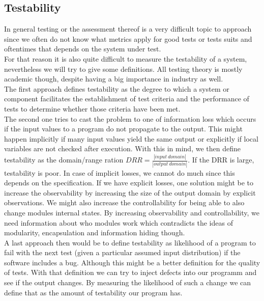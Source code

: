 \subsection{Testability}
In general testing or the assessment thereof is a very difficult topic to approach since we often do not know what metrics apply for good tests or tests suits and oftentimes that depends on the system under test.\\
For that reason it is also quite difficult to measure the testability of a system, nevertheless we will try to give some definitions.
All testing theory is mostly academic though, despite having a big importance in industry as well.\\

The first approach defines testability as the degree to which a system or component facilitates the establishment of test criteria and the performance of tests to determine whether those criteria have been met.\\

The second one tries to cast the problem to one of information loss which occurs if the input values to a program do not propagate to the output.
This might happen implicitly if many input values yield the same output or explicitly if local variables are not checked after execution.
With this in mind, we then define testability as the domain/range ration $DRR = \frac{|input~domain|}{|output~domain|}$.
If the DRR is large, testability is poor.
In case of implicit losses, we cannot do much since this depends on the specification.
If we have explicit losses, one solution might be to increase the observability by increasing the size of the output domain by explicit observations.
We might also increase the controllability for being able to also change modules internal states.
By increasing observability and controllability, we need information about who modules work which contradicts the ideas of modularity, encapsulation and information hiding though.\\

A last approach then would be to define testability as likelihood of a program to fail with the next test (given a particular assumed input distribution) if the software includes a bug.
Although this might be a better definition for the quality of tests.
With that definition we can try to inject defects into our programm and see if the output changes.
By measuring the likelihood of such a change we can define that as the amount of testability our program has.
